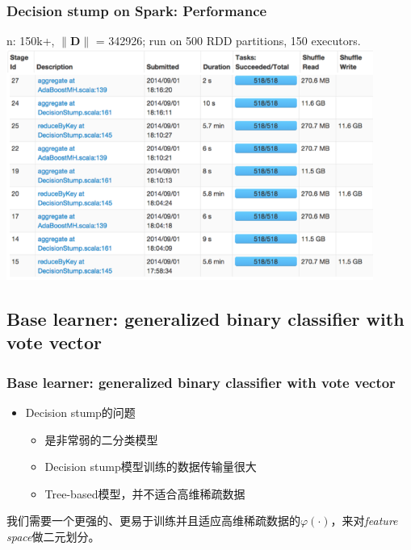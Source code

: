 \documentclass{beamer}
\begin{document}
\begin{frame}
\frametitle{Decision stump on Spark: Performance}
{ \small
n: 150k+, $\|\mathbf{D}\|$ = 342926; run on 500 RDD partitions, 150 executors.\\
}
\includegraphics[width=0.9\textwidth]{img/ds_perf.png}
\end{frame}

\subsection{Base learner: generalized binary classifier with vote vector}

\begin{frame}
\frametitle{Base learner: generalized binary classifier with vote vector}
\begin{itemize}
\item Decision stump的问题
  \begin{itemize}
    \item 是非常弱的二分类模型
    \item Decision stump模型训练的数据传输量很大
    \item Tree-based模型，并不适合高维稀疏数据
  \end{itemize}
\end{itemize}

\pause

\begin{block}{}
我们需要一个更强的、更易于训练并且适应高维稀疏数据的$\varphi(\cdot)$，来对\textit{feature space}做二元划分。
\end{block}
\end{frame}
\end{document}

